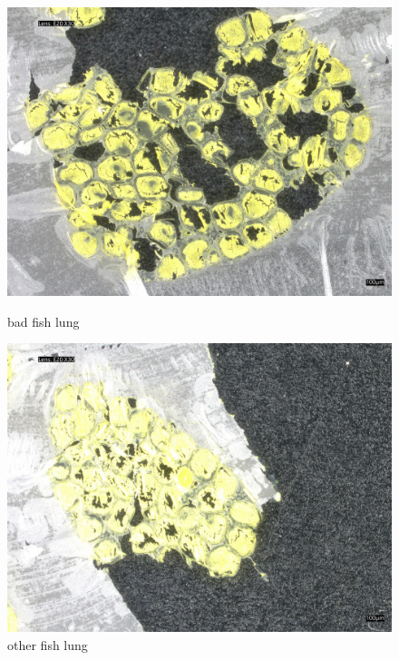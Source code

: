 \begin{figure}
    \centering
    \begin{minipage}{0.45\textwidth}
        \centering
        \includegraphics[width=\textwidth]{./fig/fish_lung/bad20240313_140952.jpg}
        \caption{bad fish lung}
        \label{fig:bad_fish_lung}
    \end{minipage}
    \begin{minipage}{0.45\textwidth}
        \centering
        \includegraphics[width=\textwidth]{./fig/fish_lung/other20240313_141858.jpg}
        \caption{other fish lung}
        \label{fig:other_fish_lung}
\end{minipage}
\end{figure}


